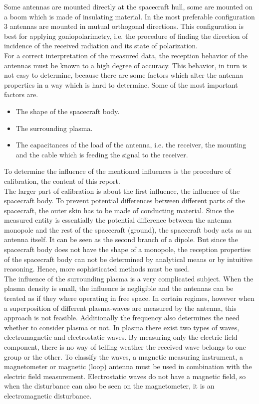 \documentclass[a4paper,11pt]{report}
\begin{document}
Some antennas are mounted directly at the spacecraft hull, some are mounted on a boom which is made of insulating material. In the most preferable configuration 3 antennas are mounted in mutual orthogonal directions. This configuration is best for applying goniopolarimetry, i.e. the procedure of finding the direction of incidence of the received radiation and its state of polarization.\\

For a correct interpretation of the measured data, the reception behavior of the antennas must be known to a high degree of accuracy. This behavior, in turn is not easy to determine, because there are some factors which alter the antenna properties in a way which is hard to determine. Some of the most important factors are.

\begin{itemize}
 \item The shape of the spacecraft body.
\item The surrounding plasma.
\item The capacitances of the load of the antenna, i.e. the receiver, the mounting and the cable which is feeding the signal to the receiver.
\end{itemize}

To determine the influence of the mentioned influences is the procedure of calibration, the content of this report.\\

The larger part of calibration is about the first influence, the influence of the spacecraft body. To prevent potential differences between different parts of the spacecraft, the outer skin has to be made of conducting material. Since the measured entity is essentially the potential difference between the antenna monopole and the rest of the spacecraft (ground), the spacecraft body acts as an antenna itself. It can be seen as the second branch of a dipole. But since the spacecraft body does not have the shape of a monopole, the reception properties of the spacecraft body can not be determined by analytical means or by intuitive reasoning. Hence, more sophisticated methods must be used.\\

The influence of the surrounding plasma is a very complicated subject. When the plasma density is small, the influence is negligible and the antennas can be treated as if they where operating in free space. In certain regimes, however when a superposition of different plasma-waves are measured by the antenna, this approach is not feasible. Additionally the frequency also determines the need whether to consider plasma or not. In plasma there exist two types of waves, electromagnetic and electrostatic waves. By measuring only the electric field component, there is no way of telling weather the received wave belongs to one group or the other. To classify the waves, a magnetic measuring instrument, a magnetometer or magnetic (loop) antenna must be used in combination with the electric field measurement. Electrostatic waves do not have a magnetic field, so when the disturbance can also be seen on the magnetometer, it is an electromagnetic disturbance.\\
\end{document}
